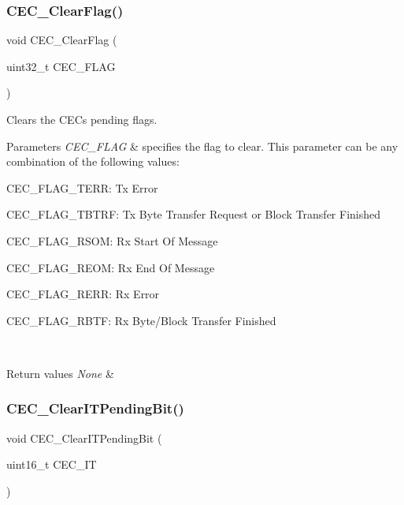 \subsubsection{\texorpdfstring{CEC\_ClearFlag()}{CEC\_ClearFlag()}}
{\footnotesize\ttfamily void C\+E\+C\+\_\+\+Clear\+Flag (\begin{DoxyParamCaption}\item[{uint32\+\_\+t}]{C\+E\+C\+\_\+\+F\+L\+AG }\end{DoxyParamCaption})}



Clears the C\+EC\textquotesingle{}s pending flags. 


\begin{DoxyParams}{Parameters}
{\em C\+E\+C\+\_\+\+F\+L\+AG} & specifies the flag to clear. This parameter can be any combination of the following values\+: \begin{DoxyItemize}
\item C\+E\+C\+\_\+\+F\+L\+A\+G\+\_\+\+T\+E\+RR\+: Tx Error \item C\+E\+C\+\_\+\+F\+L\+A\+G\+\_\+\+T\+B\+T\+RF\+: Tx Byte Transfer Request or Block Transfer Finished \item C\+E\+C\+\_\+\+F\+L\+A\+G\+\_\+\+R\+S\+OM\+: Rx Start Of Message \item C\+E\+C\+\_\+\+F\+L\+A\+G\+\_\+\+R\+E\+OM\+: Rx End Of Message \item C\+E\+C\+\_\+\+F\+L\+A\+G\+\_\+\+R\+E\+RR\+: Rx Error \item C\+E\+C\+\_\+\+F\+L\+A\+G\+\_\+\+R\+B\+TF\+: Rx Byte/\+Block Transfer Finished \end{DoxyItemize}
\\
\hline
\end{DoxyParams}

\begin{DoxyRetVals}{Return values}
{\em None} & \\
\hline
\end{DoxyRetVals}
\mbox{\label{group___c_e_c___exported___functions_gade646921262a077172c708953822f248}} 
\subsubsection{\texorpdfstring{CEC\_ClearITPendingBit()}{CEC\_ClearITPendingBit()}}
{\footnotesize\ttfamily void C\+E\+C\+\_\+\+Clear\+I\+T\+Pending\+Bit (\begin{DoxyParamCaption}\item[{uint16\+\_\+t}]{C\+E\+C\+\_\+\+IT }\end{DoxyParamCaption})}




